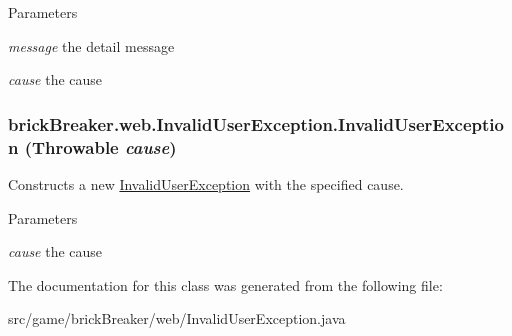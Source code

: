 \begin{DoxyParams}{Parameters}
\item[{\em message}]the detail message \item[{\em cause}]the cause \end{DoxyParams}
\hypertarget{classbrick_breaker_1_1web_1_1_invalid_user_exception_a3d20137414f9e52364048c36045ffac0}{
\subsubsection[{InvalidUserException}]{\setlength{\rightskip}{0pt plus 5cm}brickBreaker.web.InvalidUserException.InvalidUserException (Throwable {\em cause})}}
\label{classbrick_breaker_1_1web_1_1_invalid_user_exception_a3d20137414f9e52364048c36045ffac0}
Constructs a new {\ttfamily \hyperlink{classbrick_breaker_1_1web_1_1_invalid_user_exception}{InvalidUserException}} with the specified cause.


\begin{DoxyParams}{Parameters}
\item[{\em cause}]the cause \end{DoxyParams}


The documentation for this class was generated from the following file:\begin{DoxyCompactItemize}
\item 
src/game/brickBreaker/web/InvalidUserException.java\end{DoxyCompactItemize}
